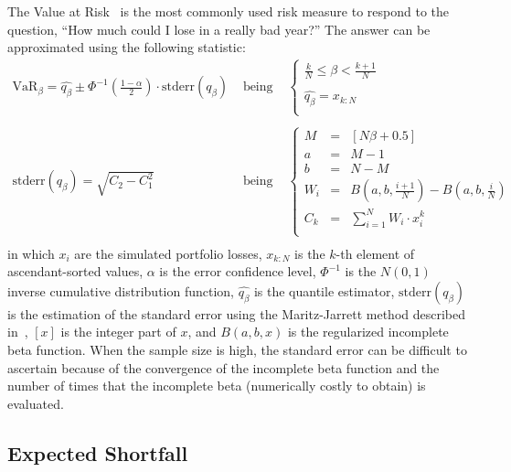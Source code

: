 \documentclass[11pt,fleqn]{book} %
\begin{document}
The Value at Risk~\cite{var:jorion} is the most commonly used risk measure 
to respond to the question, ``How much could I lose in a really bad year?''
The answer can be approximated using the following statistic:
\begin{displaymath}
	\begin{array}{lcl}
		\textrm{VaR}_{\beta} = \widehat{q_{\beta}} \pm \Phi^{-1}\left(\frac{1-\alpha}{2}\right) \cdot \textrm{stderr}(q_{\beta})
		& \text{ being } &
		\left\{
		\begin{array}{l}
			\displaystyle
			\frac{k}{N} \leq \beta < \frac{k+1}{N} \\
			\\
			\displaystyle
			\widehat{q_{\beta}} = x_{k:N} \\
		\end{array}
		\right.
		\\
		& &
		\\
		\textrm{stderr}(q_{\beta}) = \sqrt{C_2 - C_1^2}
		& \text{ being } &
		\left\{
		\begin{array}{rcl}
			M   & = & [N \beta + 0.5]  \\
			a   & = & M - 1            \\
			b   & = & N - M            \\
			W_i & = & B(a,b,\frac{i+1}{N}) - B(a,b,\frac{i}{N}) \\
			C_k & = & \sum_{i=1}^{N} W_i \cdot x_i^k \\
		\end{array}
		\right.
		\\
	\end{array}
\end{displaymath}
in which $x_i$ are the simulated portfolio losses, $x_{k:N}$ is the $k$-th 
element of ascendant-sorted values, $\alpha$ is the error confidence level, 
$\Phi^{-1}$ is the $N(0,1)$ inverse cumulative distribution function, 
$\widehat{q_{\beta}}$ is the quantile estimator, $\textrm{stderr}(q_{\beta})$ 
is the estimation of the standard error using the Maritz-Jarrett method 
described in~\cite[chap. 3.5.3]{wilcox:2004}, $[x]$ is the integer part of 
$x$, and $B(a,b,x)$ is the regularized incomplete beta function.
When the sample size is high, the standard error can be difficult to ascertain 
because of the convergence of the incomplete beta function and the number of 
times that the incomplete beta (numerically costly to obtain) is evaluated.

\subsection{Expected Shortfall}
\end{document}
